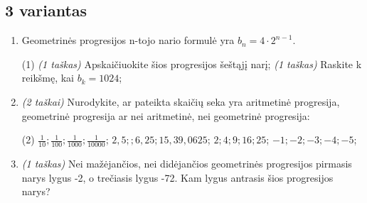 \documentclass[a4paper]{article}
\begin{document}
\subsection*{3 variantas}

\begin{enumerate}
      \item Geometrinės progresijos n-tojo nario formulė yra $b_{n}=4 \cdot
                  2^{n-1}$.

            \begin{tasks}[item-format={\normalfont}, after-item-skip=2mm](1)
                  \task \textit{(1 taškas)} Apskaičiuokite šios progresijos
                  šeštąjį narį;
                  \task \textit{(1 taškas)} Raskite k reikšmę, kai $b_k=1024$;
            \end{tasks}

      \item \textit{(2 taškai)} Nurodykite, ar pateikta skaičių seka yra
            aritmetinė progresija, geometrinė progresija ar nei aritmetinė, nei
            geometrinė progresija:
            \begin{tasks}[item-format={\normalfont}, after-item-skip=2mm](2)
                  \task $\frac{1}{10}; \frac{1}{100}; \frac{1}{1000};
                        \frac{1}{10000}$;
                  \task $2,5;;6,25;15,39,0625$;
                  \task $2; 4; 9; 16; 25$;
                  \task $-1;-2;-3;-4;-5$;
            \end{tasks}

      \item \textit{(1 taškas)} Nei mažėjančios, nei didėjančios geometrinės
            progresijos pirmasis
            narys lygus -2, o trečiasis lygus -72. Kam lygus antrasis šios
            progresijos narys?


\end{enumerate}
\end{document}
